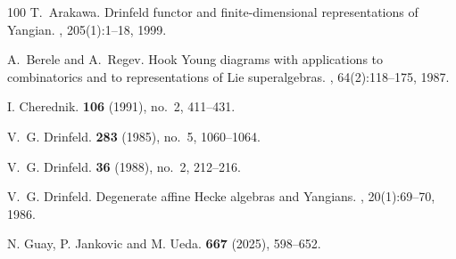 \documentclass{article}
\theoremstyle{definition}
\theoremstyle{remark}
\numberwithin{equation}{section}
\numberwithin{equation}{section}
\begin{document}
\begin{thebibliography}{100}
T.~Arakawa.
\newblock Drinfeld functor and finite-dimensional representations of {Y}angian.
, 205(1):1--18, 1999.

A.~Berele and A.~Regev.
\newblock Hook {Y}oung diagrams with applications to combinatorics and to
  representations of {L}ie superalgebras.
, 64(2):118--175, 1987.

I. Cherednik.
 {\bf 106} (1991), no.~2, 411--431.

V.~G. Drinfeld.
 {\bf 283} (1985), no.~5, 1060--1064.

V.~G. Drinfeld. 
 {\bf 36} (1988), no.~2, 212--216.

V.~G. Drinfeld.
\newblock Degenerate affine {H}ecke algebras and {Y}angians.
, 20(1):69--70, 1986.

N. Guay, P. Jankovic and M. Ueda.
 {\bf 667} (2025), 598--652.


\end{thebibliography}
\end{document}
